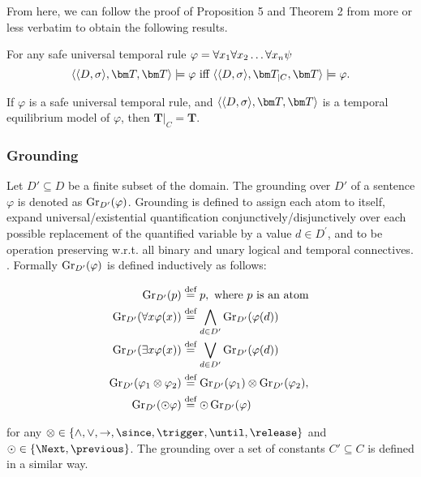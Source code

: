 From here, we can follow the proof of Proposition 5 and Theorem 2 from \cite{agcapevidi17a} more
or less verbatim to obtain the following results.

\begin{proposition}
  For any safe universal temporal rule $\varphi = \forall x_1 \forall x_2 \dots \forall x_n \psi$
  \begin{equation*} \qttandt \models \varphi \text{ iff } \qttcandt \models \varphi. \end{equation*}
\end{proposition}

\begin{theorem}
  If $\varphi$ is a safe universal temporal rule, and $\qttandt$ is a temporal equilibrium
  model of $\varphi$, then $\bm{T}\vert_{C}=\bm{T}$.
\end{theorem}

\subsubsection{Grounding}

Let $D'\subseteq D$ be a finite subset of the domain. The
grounding over $D'$ of a sentence $\varphi$ is denoted as
$\operatorname{Gr}_{D'}(\varphi)$. Grounding is defined to assign each atom to
itself, expand universal/existential quantification
conjunctively/disjunctively over each possible replacement of the
quantified variable by a value $d \in D^\prime$, and to be operation
preserving w.r.t. all binary and unary logical and temporal
connectives. \cite{agcapevidi17a}. Formally
$\operatorname{Gr}_{D^{\prime}}(\varphi)$ is defined inductively as follows:

\begin{align*}
  \operatorname{Gr}_{D^{\prime}}(p) & \stackrel{\text{def}}{=} p, \text { where } p \text { is an atom } \\
  \operatorname{Gr}_{D^{\prime}}(\forall x \varphi(x)) & \stackrel{\text{def}}{=} \bigwedge_{d \in D^{\prime}} \operatorname{Gr}_{D^{\prime}}(\varphi(d)) \\
  \operatorname{Gr}_{D^{\prime}}(\exists x \varphi(x)) & \stackrel{\text{def}}{=} \bigvee_{d \in D^{\prime}} \operatorname{Gr}_{D^{\prime}}(\varphi(d)) \\
  \operatorname{Gr}_{D^{\prime}}(\varphi_1 \otimes \varphi_2) & \stackrel{\text{def}}{=} \operatorname{Gr}_{D^{\prime}}(\varphi_1) \otimes \operatorname{Gr}_{D^{\prime}}(\varphi_2), \\
  \operatorname{Gr}_{D^{\prime}}(\odot \varphi) & \stackrel{\text{def}}{=} \odot \operatorname{Gr}_{D^{\prime}}(\varphi) \\
\end{align*}

for any
$\otimes \in \{ \land, \lor, \rightarrow, \since, \trigger, \until,
\release \}$ and $\odot \in \{ \Next, \previous \}$. The grounding
over a set of constants $C' \subseteq C$ is defined in a similar way.

